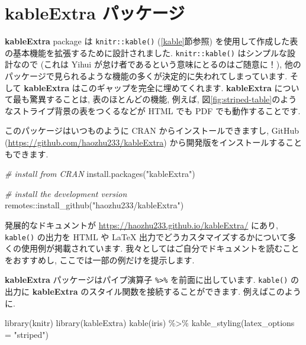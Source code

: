 \documentclass[
  11pt,
  lualatex,
  ja=standard]{bxjsreport}
\newenvironment{Shaded}{\begin{snugshade}}{\end{snugshade}}
\newcommand{\AttributeTok}[1]{\textcolor[rgb]{0.77,0.63,0.00}{#1}}
\newcommand{\CommentTok}[1]{\textcolor[rgb]{0.56,0.35,0.01}{\textit{#1}}}
\newcommand{\FunctionTok}[1]{\textcolor[rgb]{0.00,0.00,0.00}{#1}}
\newcommand{\NormalTok}[1]{#1}
\newcommand{\SpecialCharTok}[1]{\textcolor[rgb]{0.00,0.00,0.00}{#1}}
\newcommand{\StringTok}[1]{\textcolor[rgb]{0.31,0.60,0.02}{#1}}
\begin{document}
\hypertarget{kableextra}{%
\section{\texorpdfstring{\textbf{kableExtra} パッケージ}{kableExtra パッケージ}}\label{kableextra}}

\textbf{kableExtra} package \autocite{R-kableExtra}は \texttt{knitr::kable()} (\ref{kable}節参照) を使用して作成した表の基本機能を拡張するために設計されました. \texttt{knitr::kable()} はシンプルな設計なので (これは Yihui が怠け者であるという意味にとるのはご随意に！), 他のパッケージで見られるような機能の多くが決定的に失われてしまっています. そして \textbf{kableExtra} はこのギャップを完全に埋めてくれます. \textbf{kableExtra} について最も驚異することは, 表のほとんどの機能, 例えば, 図\ref{fig:striped-table}のようなストライプ背景の表をつくるなどが HTML でも PDF でも動作することです.

このパッケージはいつものように CRAN からインストールできますし, GitHub (\url{https://github.com/haozhu233/kableExtra}) から開発版をインストールすることもできます.

\begin{Shaded}
\begin{Highlighting}[numbers=left,,]
\CommentTok{\# install from CRAN}
\FunctionTok{install.packages}\NormalTok{(}\StringTok{"kableExtra"}\NormalTok{)}

\CommentTok{\# install the development version}
\NormalTok{remotes}\SpecialCharTok{::}\FunctionTok{install\_github}\NormalTok{(}\StringTok{"haozhu233/kableExtra"}\NormalTok{)}
\end{Highlighting}
\end{Shaded}

発展的なドキュメントが \url{https://haozhu233.github.io/kableExtra/} にあり, \texttt{kable()} の出力を HTML や LaTeX 出力でどうカスタマイズするかについて多くの使用例が掲載されています. 我々としてはご自分でドキュメントを読むことをおすすめし, ここでは一部の例だけを提示します.

\textbf{kableExtra} パッケージはパイプ演算子 \texttt{\%\textgreater{}\%} を前面に出しています. \texttt{kable()} の出力に \textbf{kableExtra} のスタイル関数を接続することができます. 例えばこのように.

\begin{Shaded}
\begin{Highlighting}[numbers=left,,]
\FunctionTok{library}\NormalTok{(knitr)}
\FunctionTok{library}\NormalTok{(kableExtra)}
\FunctionTok{kable}\NormalTok{(iris) }\SpecialCharTok{\%\textgreater{}\%}
  \FunctionTok{kable\_styling}\NormalTok{(}\AttributeTok{latex\_options =} \StringTok{"striped"}\NormalTok{)}
\end{Highlighting}
\end{Shaded}
\end{document}
